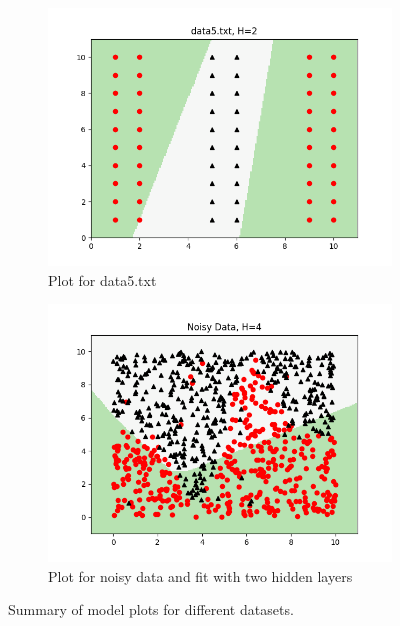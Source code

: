 \documentclass{article}
\begin{document}
\begin{figure}[H]
  \vspace{1em}

  \begin{subfigure}[b]{0.48\textwidth}
    \centering
    \includegraphics[width=\textwidth, height=0.35\textheight, keepaspectratio]{./plots/data5_H2.png}
    \caption{Plot for data5.txt}
    \label{fig:d5}
  \end{subfigure}
  \hfill
  \begin{subfigure}[b]{0.48\textwidth}
    \centering
    \includegraphics[width=\textwidth, height=0.35\textheight, keepaspectratio]{./plots/noisy_H4.png}
    \caption{Plot for noisy data and fit with two hidden layers}
    \label{fig:n1}
  \end{subfigure}

  \caption{Summary of model plots for different datasets.} %
  \label{fig:all_data_plots}
\end{figure}
\end{document}
